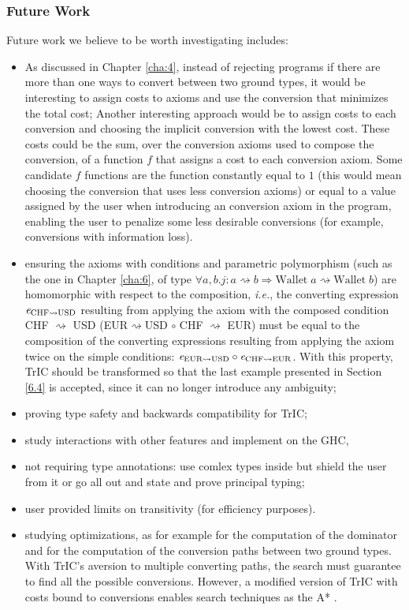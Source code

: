 \subsubsection{Future Work}
Future work we believe to be worth investigating includes:
\begin{itemize}
\item As discussed in Chapter \ref{cha:4}, instead of rejecting programs if there are more than one ways to convert between two ground types, it would be interesting to assign costs to axioms and use the conversion that minimizes the total cost;
  Another interesting approach would be to assign costs to each conversion and choosing the implicit conversion with the lowest cost. These costs could be the sum, over the conversion axioms used to compose the conversion, of a function $f$ that assigns a cost to each conversion axiom. Some candidate $f$ functions are the function constantly equal to $1$ (this would mean choosing the conversion that uses less conversion axioms) or equal to a value assigned by the user when introducing an conversion axiom in the program, enabling the user to penalize some less desirable conversions (for example, conversions with information loss).
  \item ensuring the axioms with conditions and parametric polymorphism (such as the one in Chapter \ref{cha:6}, of type $\forall a, b . j : a \rightsquigarrow b \Rightarrow \text{Wallet}\;a\rightsquigarrow \text{Wallet}\;b$) are homomorphic with respect to the composition, \textit{i.e.}, the converting expression $\mathit{e}_{\text{CHF}\rightsquigarrow\text{USD}}$ resulting from applying the axiom with the composed condition CHF $\rightsquigarrow$ USD (EUR$\rightsquigarrow$USD $\circ$ CHF $\rightsquigarrow$ EUR) must be equal to the composition of the converting expressions resulting from applying the axiom twice on the simple conditions: $\mathit{e}_{\text{EUR}\rightsquigarrow\text{USD}}\circ\mathit{e}_{\text{CHF}\rightsquigarrow\text{EUR}} $. With this property, TrIC should be transformed so that the last example presented in Section \ref{6.4} is accepted, since it can no longer introduce any ambiguity;
\item proving type safety and backwards compatibility for TrIC;
\item study interactions with other features and implement on the GHC,
\item not requiring type annotations: use comlex types inside but shield the user from it or go all out and state and prove principal typing;
\item user provided limits on transitivity (for efficiency purposes).
  \item studying optimizations, as for example for the computation of the dominator \cite{tarjan} and for the computation of the conversion paths between two ground types. With TrIC's aversion to multiple converting paths, the search must guarantee to find all the possible conversions. However, a modified version of TrIC with costs bound to conversions enables search techniques as the A* \cite{astar}.
\end{itemize}


